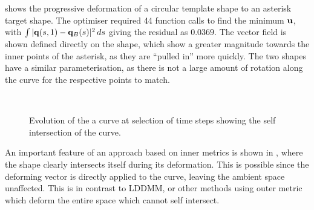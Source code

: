 \documentclass[a4paper, 12pt]{article}
\begin{document}
 shows the progressive deformation of a circular template
shape to an asterisk target shape. The optimiser required 44 function calls to
find the minimum $\mathbf{u}$, with $\int \vert \mathbf{q}(s,1) - \mathbf{q}_B(s)
\vert^2\,ds$ giving the residual as $0.0369$. The vector field is shown defined
directly on the shape, which show a greater magnitude towards the inner points
of the asterisk, as they are ``pulled in'' more quickly. The two shapes have a
similar parameterisation, as there is not a large amount of rotation along the
curve for the respective points to match.

\begin{figure}[!h]
  \centering
  \\
  \caption[Self intersection of the curve]{Evolution of the a curve at selection of time steps showing the self
    intersection of the curve.}
\label{fig:intersection}
\end{figure}
An important feature of an approach based on inner metrics is shown in
, where the shape clearly intersects itself during its
deformation. This is possible since the deforming vector is directly applied to
the curve, leaving the ambient space unaffected. This is in contrast to LDDMM,
or other methods using outer metric which deform the entire space which cannot
self intersect.
\end{document}
